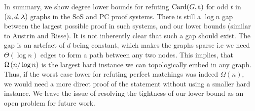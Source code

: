 \documentclass[11pt]{article}
\begin{document}
\par
In summary, we show degree lower bounds for refuting $\text{Card}(G, \mathbf{t})$ for odd $t$ in $(n, d, \lambda)$ graphs in the SoS and PC proof systems.
There is still a $\log n$ gap between the largest possible proof in such systems, and our lower bounds (similar to Austrin and Risse).
It is not inherently clear that such a gap should exist.
The gap is an artefact of $d$ being constant, which makes the graphs sparse i.e we need $\Theta(\log n)$ edges to form a path between any two nodes.
This implies, that $\Omega\left(n/\log n\right)$ is the largest hard instance we can topologically embed in any graph.
Thus, if the worst case lower for refuting perfect matchings was indeed $\Omega(n)$, we would need a more direct proof of the statement without using a smaller hard instance.
We leave the issue of resolving the tightness of our lower bound as an open problem for future work.



\clearpage
\appendix
\end{document}
